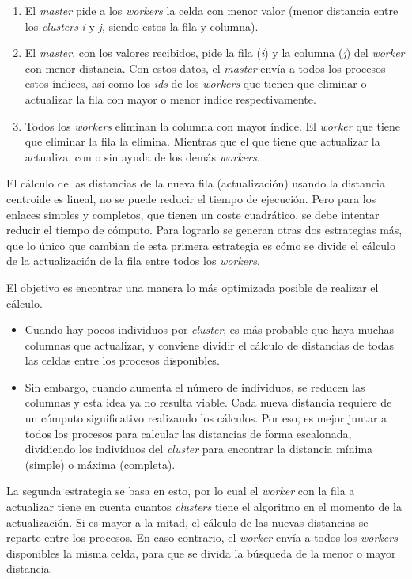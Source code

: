 		\begin{enumerate}
			\item El \textit{master} pide a los \textit{workers} la celda con menor valor (menor distancia entre los \textit{clusters} \textit{i} y \textit{j}, siendo estos la fila y columna). 
			\item El \textit{master}, con los valores recibidos, pide la fila (\textit{i}) y la columna (\textit{j}) del \textit{worker} con menor distancia. Con estos datos, el \textit{master} envía a todos los procesos estos índices, así como los \textit{ids} de los \textit{workers} que tienen que eliminar o actualizar la fila con mayor o menor índice respectivamente.
			\item Todos los \textit{workers} eliminan la columna con mayor índice. El \textit{worker} que tiene que eliminar la fila la elimina. Mientras que el que tiene que actualizar la actualiza, con o sin ayuda de los demás \textit{workers}.
		\end{enumerate}
								
		
		El cálculo de las distancias de la nueva fila (actualización) usando la distancia centroide es lineal, no se puede reducir el tiempo de ejecución. Pero para los enlaces simples y completos, que tienen un coste cuadrático, se debe intentar reducir el tiempo de cómputo. Para lograrlo se generan otras dos estrategias más, que lo único que cambian de esta primera estrategia es cómo se divide el cálculo de la actualización de la fila entre todos los \textit{workers}. 
		
		El objetivo es encontrar una manera lo más optimizada posible de realizar el cálculo. 
		\begin{itemize}
			\item Cuando hay pocos individuos por \textit{cluster}, es más probable que haya muchas columnas que actualizar, y conviene dividir el cálculo de distancias de todas las celdas entre los procesos disponibles. 
			\item Sin embargo, cuando aumenta el número de individuos, se reducen las columnas y esta idea ya no resulta viable. Cada nueva distancia requiere de un cómputo significativo realizando los cálculos. Por eso, es mejor juntar a todos los procesos para calcular las distancias de forma escalonada, dividiendo los individuos del \textit{cluster} para encontrar la distancia mínima (simple) o máxima (completa).
		\end{itemize}
		
		La segunda estrategia se basa en esto, por lo cual el \textit{worker} con la fila a actualizar tiene en cuenta cuantos \textit{clusters} tiene el algoritmo en el momento de la actualización. Si es mayor a la mitad, el cálculo de las nuevas distancias se reparte entre los procesos. En caso contrario, el \textit{worker} envía a todos los \textit{workers} disponibles la misma celda, para que se divida la búsqueda de la menor o mayor distancia.
		
